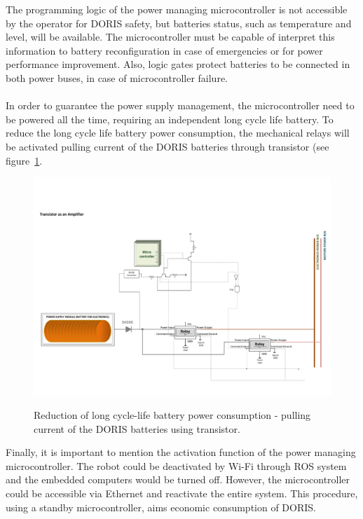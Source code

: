 The programming logic of the power managing microcontroller is not accessible by the operator for DORIS safety, but batteries status, such as temperature and level, will be available. The microcontroller must be capable of interpret this information to battery reconfiguration in case of emergencies or for power performance improvement. Also, logic gates protect batteries to be connected in both power buses, in case of microcontroller failure.\\
\\
In order to guarantee the power supply management, the microcontroller need to be powered all the time, requiring an independent long cycle life battery. To reduce the long cycle life battery power consumption, the mechanical relays will be activated pulling current of the DORIS batteries through transistor (see figure~\ref{FIG:SUPCIRPS3}.
\begin{figure}
  \centering
  \includegraphics[width=1\columnwidth]{figs/tables/geralblockPS3.pdf}\\
  \caption[Reduction of long cycle-life battery power consumption - pulling current of the DORIS batteries using transistor]{Reduction of long cycle-life battery power consumption - pulling current of the DORIS batteries using transistor.}
  \label{FIG:SUPCIRPS3}
\end{figure}
Finally, it is important to mention the activation function of the power managing microcontroller. The robot could be deactivated by Wi-Fi through ROS system and the embedded computers would be turned off. However, the microcontroller could be accessible via Ethernet and reactivate the entire system. This procedure, using a standby microcontroller, aims economic consumption of DORIS.